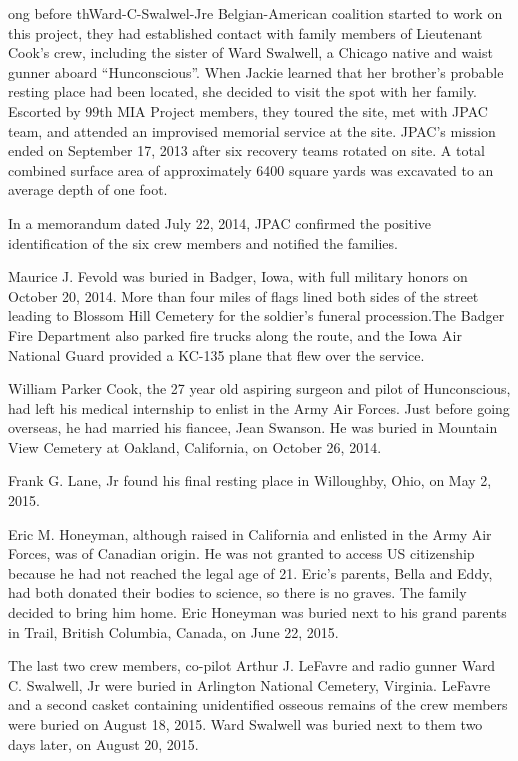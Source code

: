 \documentclass{article}
\begin{document}
\begin{multicols}{3}
ong before thWard-C-Swalwel-Jre Belgian-American coalition started to work on this project, they had established contact with family members of Lieutenant Cook’s crew, including the sister of Ward Swalwell, a Chicago native and waist gunner aboard “Hunconscious”. When Jackie learned that her brother’s probable resting place had been located, she decided to visit the spot with her family. Escorted by 99th MIA Project members, they toured the site, met with JPAC team, and attended an improvised memorial service at the site. JPAC’s mission ended on September 17, 2013 after six recovery teams rotated on site. A total combined surface area of approximately 6400 square yards was excavated to an average depth of one foot.

In a memorandum dated July 22, 2014, JPAC confirmed the positive identification of the six crew members and notified the families.

Maurice J. Fevold was buried in Badger, Iowa, with full military honors on October 20, 2014. More than four miles of flags lined both sides of the street leading to Blossom Hill Cemetery for the soldier’s funeral procession.The Badger Fire Department also parked fire trucks along the route, and the Iowa Air National Guard provided a KC-135 plane that flew over the service.

William Parker Cook, the 27 year old aspiring surgeon and pilot of Hunconscious, had left his medical internship to enlist in the Army Air Forces. Just before going overseas, he had married his fiancee, Jean Swanson. He was buried in Mountain View Cemetery at Oakland, California, on October 26, 2014.

Frank G. Lane, Jr found his final resting place in Willoughby, Ohio, on May 2, 2015.

Eric M. Honeyman, although raised in California and enlisted in the Army Air Forces, was of Canadian origin. He was not granted to access US citizenship because he had not reached the legal age of 21. Eric’s parents, Bella and Eddy, had both donated their bodies to science, so there is no graves. The family decided to bring him home. Eric Honeyman was buried next to his grand parents in Trail, British Columbia, Canada, on June 22, 2015.

The last two crew members, co-pilot Arthur J. LeFavre and radio gunner Ward C. Swalwell, Jr were buried in Arlington National Cemetery, Virginia. LeFavre and a second casket containing unidentified osseous remains of the crew members were buried on August 18, 2015.  Ward Swalwell was buried next to them two days later, on August 20, 2015.


\end{multicols}
\end{document}
